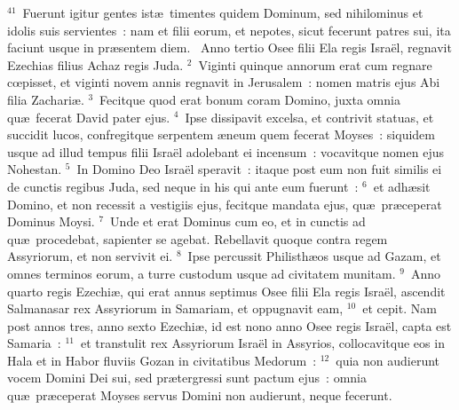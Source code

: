 ${}^{41}$~Fuerunt igitur gentes ist\ae\ timentes quidem Dominum, sed nihilominus et idolis suis servientes~: nam et filii eorum, et nepotes, sicut fecerunt patres sui, ita faciunt usque in pr\ae sentem diem.
~Anno tertio Osee filii Ela regis Isra\"el, regnavit Ezechias filius Achaz regis Juda.
${}^{2}$~Viginti quinque annorum erat cum regnare cœpisset, et viginti novem annis regnavit in Jerusalem~: nomen matris ejus Abi filia Zachari\ae .
${}^{3}$~Fecitque quod erat bonum coram Domino, juxta omnia qu\ae\ fecerat David pater ejus.
${}^{4}$~Ipse dissipavit excelsa, et contrivit statuas, et succidit lucos, confregitque serpentem \ae neum quem fecerat Moyses~: siquidem usque ad illud tempus filii Isra\"el adolebant ei incensum~: vocavitque nomen ejus Nohestan.
${}^{5}$~In Domino Deo Isra\"el speravit~: itaque post eum non fuit similis ei de cunctis regibus Juda, sed neque in his qui ante eum fuerunt~:
${}^{6}$~et adh\ae sit Domino, et non recessit a vestigiis ejus, fecitque mandata ejus, qu\ae\ pr\ae ceperat Dominus Moysi.
${}^{7}$~Unde et erat Dominus cum eo, et in cunctis ad qu\ae\ procedebat, sapienter se agebat. Rebellavit quoque contra regem Assyriorum, et non servivit ei.
${}^{8}$~Ipse percussit Philisth\ae os usque ad Gazam, et omnes terminos eorum, a turre custodum usque ad civitatem munitam.
${}^{9}$~Anno quarto regis Ezechi\ae , qui erat annus septimus Osee filii Ela regis Isra\"el, ascendit Salmanasar rex Assyriorum in Samariam, et oppugnavit eam,
${}^{10}$~et cepit. Nam post annos tres, anno sexto Ezechi\ae , id est nono anno Osee regis Isra\"el, capta est Samaria~:
${}^{11}$~et transtulit rex Assyriorum Isra\"el in Assyrios, collocavitque eos in Hala et in Habor fluviis Gozan in civitatibus Medorum~:
${}^{12}$~quia non audierunt vocem Domini Dei sui, sed pr\ae tergressi sunt pactum ejus~: omnia qu\ae\ pr\ae ceperat Moyses servus Domini non audierunt, neque fecerunt.


